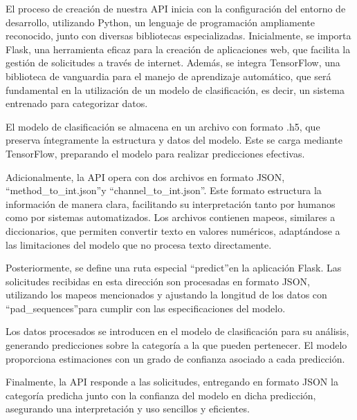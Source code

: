 El proceso de creación de nuestra API inicia con la configuración del entorno de desarrollo, utilizando Python, un lenguaje de programación ampliamente reconocido, junto con diversas bibliotecas especializadas. Inicialmente, se importa Flask, una herramienta eficaz para la creación de aplicaciones web, que facilita la gestión de solicitudes a través de internet. Además, se integra TensorFlow, una biblioteca de vanguardia para el manejo de aprendizaje automático, que será fundamental en la utilización de un modelo de clasificación, es decir, un sistema entrenado para categorizar datos.

El modelo de clasificación se almacena en un archivo con formato .h5, que preserva íntegramente la estructura y datos del modelo. Este se carga mediante TensorFlow, preparando el modelo para realizar predicciones efectivas.

Adicionalmente, la API opera con dos archivos en formato JSON, \textquotedblleft method\_to\_int.json\textquotedblright y \textquotedblleft channel\_to\_int.json\textquotedblright. Este formato estructura la información de manera clara, facilitando su interpretación tanto por humanos como por sistemas automatizados. Los archivos contienen mapeos, similares a diccionarios, que permiten convertir texto en valores numéricos, adaptándose a las limitaciones del modelo que no procesa texto directamente.

Posteriormente, se define una ruta especial \textquotedblleft\/predict\textquotedblright en la aplicación Flask. Las solicitudes recibidas en esta dirección son procesadas en formato JSON, utilizando los mapeos mencionados y ajustando la longitud de los datos con \textquotedblleft pad\_sequences\textquotedblright para cumplir con las especificaciones del modelo.

Los datos procesados se introducen en el modelo de clasificación para su análisis, generando predicciones sobre la categoría a la que pueden pertenecer. El modelo proporciona estimaciones con un grado de confianza asociado a cada predicción.

Finalmente, la API responde a las solicitudes, entregando en formato JSON la categoría predicha junto con la confianza del modelo en dicha predicción, asegurando una interpretación y uso sencillos y eficientes.

